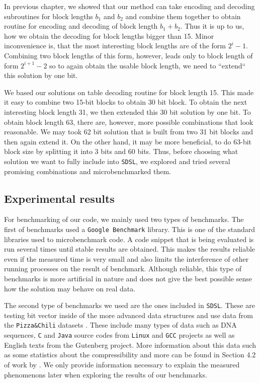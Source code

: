 In previous chapter, we showed that our method can take encoding and decoding subroutines
for block lengths $b_1$ and $b_2$ and combine them together to obtain routine for encoding and
decoding of block length $b_1+b_2$. Thus it is up to us, how we obtain the decoding for block
lengths bigger than 15. Minor inconvenience is, that the most interesting block lengths are of
the form $2^i-1$. Combining two block lengths of this form, however, leads only to block length
of form $2^{i+1}-2$ so to again obtain the usable block length, we need to ``extend`` this solution
by one bit.

We based our solutions on table decoding routine for block length 15. This made it easy to combine
two 15-bit blocks to obtain 30 bit block. To obtain the next interesting block length 31, we then
extended this 30 bit solution by one bit. To obtain block length 63, there are, however, more possible
combinations that look reasonable. We may took 62 bit solution that is built from two 31 bit blocks
and then again extend it. On the other hand, it may be more beneficial, to do 63-bit block size by
splitting it into 3 bits and 60 bits. Thus, before choosing what solution we want to fully include
into \texttt{SDSL}, we explored and tried several promising combinations and microbenchmarked them.

\subsection{Experimental results}

For benchmarking of our code, we mainly used two types of benchmarks. The first of benchmarks
used a \texttt{Google Benchmark} library. This is one of the standard libraries used to
microbenchmark code. A code snippet that is being evaluated is run several times until
stable results are obtained. This makes the results reliable even if the measured time is
very small and also limits the interference of other running processes on the result of
benchmark. Although reliable, this type of benchmarks is more artificial in nature and
does not give the best possible sense how the solution may behave on real data.

The second type of benchmarks we used are the ones included in \texttt{SDSL}. These are
testing bit vector inside of the more advanced data structures and use data from the
\texttt{Pizza\&Chili} datasets \citep{ferragina2005pizza}. These include many types of data
such as DNA sequences, \texttt{C} and \texttt{Java} source codes from \texttt{Linux} and
\texttt{GCC} projects as well as English texts from the Gutenberg project. More information
about this data such as some statistics about the compressibility and more can be found in
Section 4.2 of work by \cite{ferragina2009compressed}. We only provide information necessary
to explain the measured phenomenons later when exploring the results of our benchmarks. 

